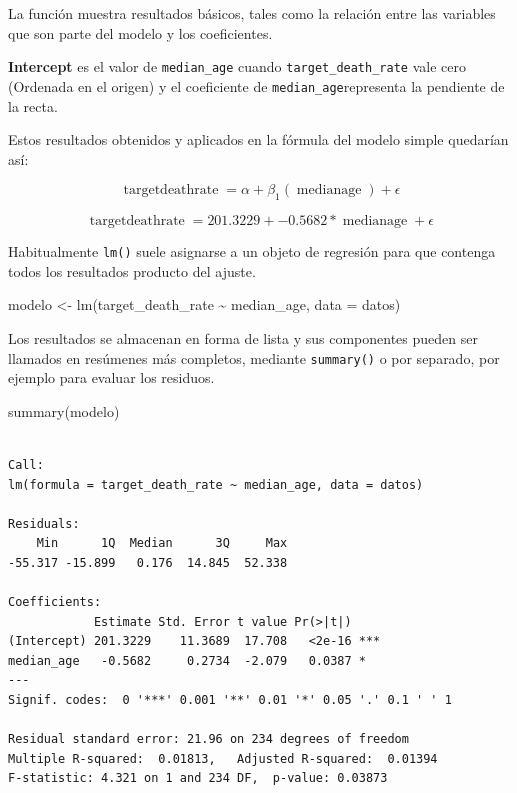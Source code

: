 \documentclass[
  letterpaper,
  DIV=11,
  numbers=noendperiod]{scrartcl}
\newenvironment{Shaded}{\begin{snugshade}}{\end{snugshade}}
\newcommand{\AttributeTok}[1]{\textcolor[rgb]{0.40,0.45,0.13}{#1}}
\newcommand{\FunctionTok}[1]{\textcolor[rgb]{0.28,0.35,0.67}{#1}}
\newcommand{\NormalTok}[1]{\textcolor[rgb]{0.00,0.23,0.31}{#1}}
\newcommand{\OtherTok}[1]{\textcolor[rgb]{0.00,0.23,0.31}{#1}}
\newcommand{\SpecialCharTok}[1]{\textcolor[rgb]{0.37,0.37,0.37}{#1}}
\begin{document}
La función muestra resultados básicos, tales como la relación entre las
variables que son parte del modelo y los coeficientes.

\textbf{Intercept} es el valor de \texttt{median\_age} cuando
\texttt{target\_death\_rate} vale cero (Ordenada en el origen) y el
coeficiente de \texttt{median\_age}representa la pendiente de la recta.

Estos resultados obtenidos y aplicados en la fórmula del modelo simple
quedarían así:

\[\operatorname{target death rate} = \alpha + \beta_{1}(\operatorname{median age}) + \epsilon \]

\[
\operatorname{target death rate} = 201.3229 + -0.5682*\operatorname{median age} + \epsilon
\]

Habitualmente \texttt{lm()} suele asignarse a un objeto de regresión
para que contenga todos los resultados producto del ajuste.

\begin{Shaded}
\begin{Highlighting}[]
\NormalTok{modelo }\OtherTok{\textless{}{-}} \FunctionTok{lm}\NormalTok{(target\_death\_rate }\SpecialCharTok{\textasciitilde{}}\NormalTok{ median\_age, }\AttributeTok{data =}\NormalTok{ datos)}
\end{Highlighting}
\end{Shaded}

Los resultados se almacenan en forma de lista y sus componentes pueden
ser llamados en resúmenes más completos, mediante \texttt{summary()} o
por separado, por ejemplo para evaluar los residuos.

\begin{Shaded}
\begin{Highlighting}[]
\FunctionTok{summary}\NormalTok{(modelo)}
\end{Highlighting}
\end{Shaded}

\begin{verbatim}

Call:
lm(formula = target_death_rate ~ median_age, data = datos)

Residuals:
    Min      1Q  Median      3Q     Max 
-55.317 -15.899   0.176  14.845  52.338 

Coefficients:
            Estimate Std. Error t value Pr(>|t|)    
(Intercept) 201.3229    11.3689  17.708   <2e-16 ***
median_age   -0.5682     0.2734  -2.079   0.0387 *  
---
Signif. codes:  0 '***' 0.001 '**' 0.01 '*' 0.05 '.' 0.1 ' ' 1

Residual standard error: 21.96 on 234 degrees of freedom
Multiple R-squared:  0.01813,   Adjusted R-squared:  0.01394 
F-statistic: 4.321 on 1 and 234 DF,  p-value: 0.03873
\end{verbatim}
\end{document}
